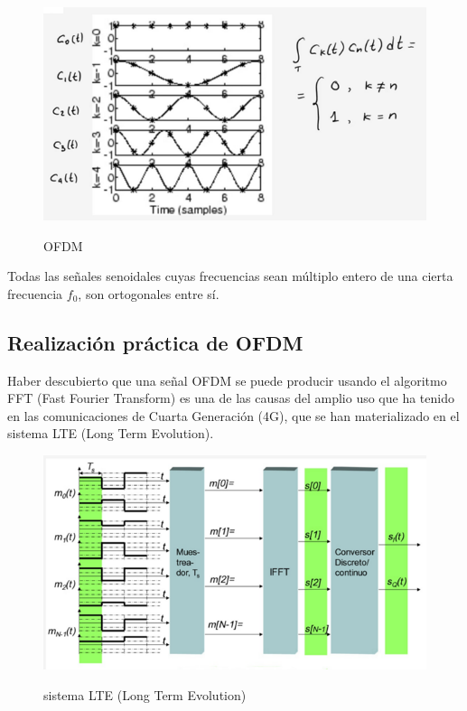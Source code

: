 \begin{figure}[h!]
	\captionsetup{justification = raggedright, singlelinecheck = false}
	\caption{OFDM} 
	\centering
	\includegraphics[scale=0.9]{Imagenes/OFDM.png}
	\label{fig:OFDM}
\end{figure}

Todas las señales senoidales cuyas frecuencias sean múltiplo entero de una cierta frecuencia $f_{0}$, son ortogonales entre sí.

\subsection{Realización práctica de OFDM}

Haber descubierto que una señal OFDM se puede producir usando el algoritmo FFT (Fast Fourier Transform) es una de las causas del amplio uso que ha tenido en las comunicaciones de Cuarta Generación (4G), que se han materializado en el sistema LTE (Long Term Evolution).

\begin{figure}[h!]
	\captionsetup{justification = raggedright, singlelinecheck = false}
	\caption{sistema LTE (Long Term Evolution)} 
	\centering
	\includegraphics[scale=0.9]{Imagenes/Multiplexar.png}
	\label{fig:Multiplexar}
\end{figure}

